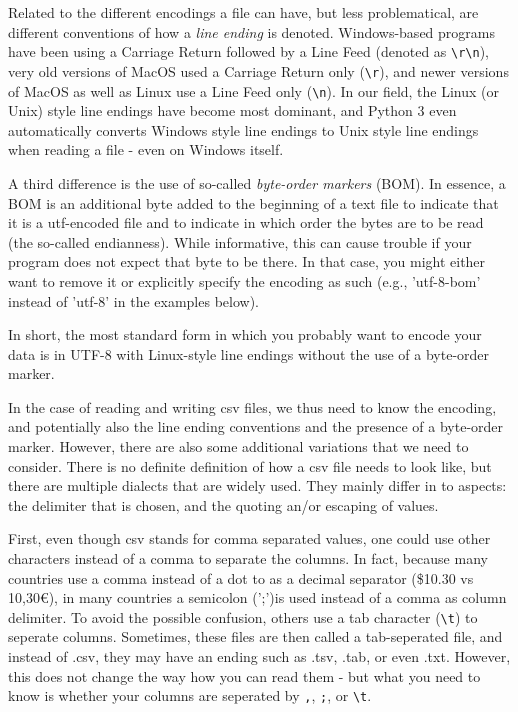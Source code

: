 Related to the different encodings a file can have, but less problematical, are different conventions of how a \emph{line ending} is denoted. Windows-based programs have been using a Carriage Return followed by a Line Feed (denoted as \texttt{\textbackslash r\textbackslash n}), very old versions of MacOS used a Carriage Return only (\texttt{\textbackslash r}), and newer versions of MacOS as well as Linux use a Line Feed only (\texttt{\textbackslash n}). In our field, the Linux (or Unix) style line endings have become most dominant, and Python 3 even automatically converts Windows style line endings to Unix style line endings when reading a file - even on Windows itself.

A third difference is the use of so-called \emph{byte-order markers} (BOM). In essence, a BOM is an additional byte added to the beginning of a text file to indicate that it is a utf-encoded file and to indicate in which order the bytes are to be read (the so-called endianness). While informative, this can cause trouble if your program does not expect that byte to be there. In that case, you might either want to remove it or explicitly specify the encoding as such (e.g., 'utf-8-bom' instead of 'utf-8' in the examples below).


In short, the most standard form in which you probably want to encode your data is in UTF-8 with Linux-style line endings without the use of a byte-order marker.


In the case of reading and writing csv files, we thus need to know the encoding, and potentially also the line ending conventions and the presence of a byte-order marker. However, there are also some additional variations that we need to consider. There is no definite definition of how a csv file needs to look like, but there are multiple dialects that are widely used. They mainly differ in to aspects: the delimiter that is chosen, and the quoting an/or escaping of values.

First, even though csv stands for comma separated values, one could use other characters instead of a comma to separate the columns. In fact, because many countries use a comma instead of a dot to as a decimal separator (\$10.30 vs 10,30€), in many countries a semicolon (';')is used instead of a comma as column delimiter. To avoid the possible confusion, others use a tab character (\texttt{\textbackslash t}) to seperate columns. Sometimes, these files are then called a tab-seperated file, and instead of .csv, they may have an ending such as .tsv, .tab, or even .txt. However, this does not change the way how you can read them - but what you need to know is whether your columns are seperated by \texttt{,}, \texttt{;}, or \texttt{\textbackslash t}. 

